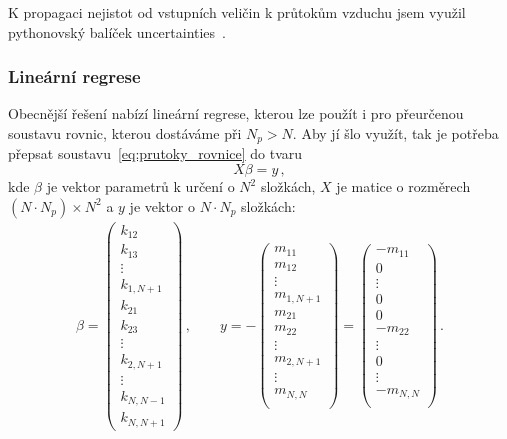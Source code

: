 K propagaci nejistot od vstupních veličin k průtokům vzduchu jsem využil pythonovský balíček uncertainties~\cite{uncertainties}.
\subsubsection{Lineární regrese}
Obecnější řešení nabízí lineární regrese, kterou lze použít i pro přeurčenou soustavu rovnic, kterou dostáváme při $N_p>N$. Aby jí šlo využít, tak je potřeba přepsat soustavu~\eqref{eq:prutoky_rovnice} do tvaru 
\begin{equation}
    X\beta=y\,,
    \label{eq:prutoky_regrese}
\end{equation}
kde $\beta$ je vektor parametrů k určení o $N^2$ složkách, $X$ je matice o rozměrech $(N\cdot N_p)\times N^2$ a $y$ je vektor o $N\cdot N_p$ složkách:
\begin{align}
    \beta=
    \begin{pmatrix}
        k_{12}\\
        k_{13}\\
        \vdots\\
        k_{1,N+1}\\
        k_{21}\\
        k_{23}\\
        \vdots\\
        k_{2,N+1}\\
        \vdots\\
        k_{N,N-1}\\
        k_{N,N+1}
    \end{pmatrix}\,,\qquad y=
    -\begin{pmatrix}
        m_{11}\\
        m_{12}\\
        \vdots\\
        m_{1,N+1}\\
        m_{21}\\
        m_{22}\\
        \vdots\\
        m_{2,N+1}\\
        \vdots\\
        m_{N,N}\\
    \end{pmatrix}=
    \begin{pmatrix}
        -m_{11}\\
        0\\
        \vdots\\
        0\\
        0\\
        -m_{22}\\
        \vdots\\
        0\\
        \vdots\\
        -m_{N,N}\\
    \end{pmatrix}
    \,.
\end{align}
